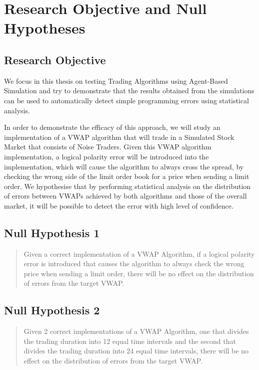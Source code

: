 \section{Research Objective and Null Hypotheses}

\subsection{Research Objective}
We focus in this thesis on testing Trading Algorithms using Agent-Based Simulation and try to demonstrate that the results obtained from the simulations can be used to automatically detect simple programming errors using statistical analysis. 

In order to demonstrate the efficacy of this approach, we will study an implementation of a VWAP algorithm that will trade in a Simulated Stock Market that consists of Noise Traders. Given this VWAP algorithm implementation, a logical polarity error will be introduced into the implementation, which will cause the algorithm to always cross the spread, by checking the wrong side of the limit order book for a price when sending a limit order. We hypothesise that by performing statistical analysis on the distribution of errors between VWAPs achieved by both algorithms and those of the overall market, it will be possible to detect the error with high level of confidence.

\subsection{Null Hypothesis 1}
\begin{quote}
Given a correct implementation of a VWAP Algorithm, if a logical polarity error is introduced that causes the algorithm to always check the wrong price when sending a limit order, there will be no effect on the distribution of errors from the target VWAP.
\end{quote}

\subsection{Null Hypothesis 2}
\begin{quote}
Given 2 correct implementations of a VWAP Algorithm, one that divides the trading duration into 12 equal time intervals and the second that divides the trading duration into 24 equal time intervals, there will be no effect on the distribution of errors from the target VWAP.
\end{quote}




